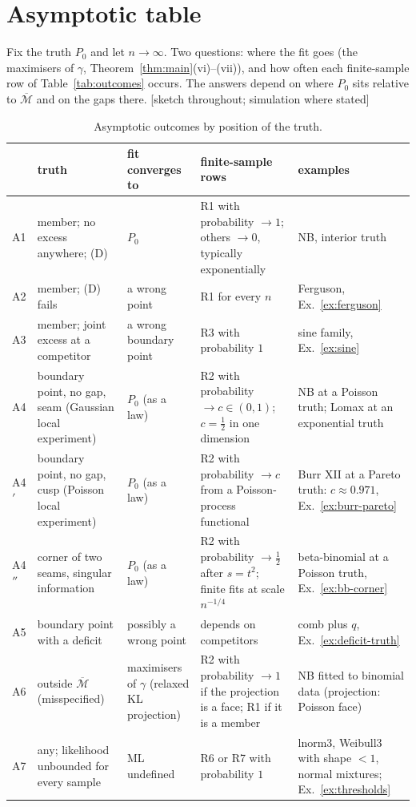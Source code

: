 \documentclass[11pt]{article}
\newcommand{\bM}{\overline{\mathcal M}}
\newcommand{\status}[1]{\textsf{[#1]}}
\theoremstyle{definition}
\theoremstyle{remark}
\begin{document}
\section{Asymptotic table}\label{sec:asymptotic}
Fix the truth $P_0$ and let $n\to\infty$. Two questions: where the fit goes
(the maximisers of $\gamma$, Theorem~\ref{thm:main}(vi)--(vii)), and how often
each finite-sample row of Table~\ref{tab:outcomes} occurs. The answers depend
on where $P_0$ sits relative to $\bM$ and on the gaps there.
\status{sketch throughout; simulation where stated}

\begin{table}[ht]
\centering\footnotesize
\begin{tabular}{@{}p{0.45cm}>{\raggedright\arraybackslash}p{3.1cm}>{\raggedright\arraybackslash}p{2.6cm}>{\raggedright\arraybackslash}p{3.4cm}>{\raggedright\arraybackslash}p{4.6cm}@{}}
\toprule
 & truth & fit converges to & finite-sample rows & examples\\
\midrule
A1 & member; no excess anywhere; (D) & $P_0$ & R1 with probability $\to1$; others $\to0$, typically exponentially & NB, interior truth\\
A2 & member; (D) fails & a wrong point & R1 for every $n$ & Ferguson, Ex.~\ref{ex:ferguson}\\
A3 & member; joint excess at a competitor & a wrong boundary point & R3 with probability $1$ & sine family, Ex.~\ref{ex:sine}\\
\midrule
A4 & boundary point, no gap, seam (Gaussian local experiment) & $P_0$ (as a law) & R2 with probability $\to c\in(0,1)$; $c=\frac12$ in one dimension & NB at a Poisson truth; Lomax at an exponential truth\\
A4$'$ & boundary point, no gap, cusp (Poisson local experiment) & $P_0$ (as a law) & R2 with probability $\to c$ from a Poisson-process functional & Burr XII at a Pareto truth: $c\approx0.971$, Ex.~\ref{ex:burr-pareto}\\
A4$''$ & corner of two seams, singular information & $P_0$ (as a law) & R2 with probability $\to\frac12$ after $s=t^2$; finite fits at scale $n^{-1/4}$ & beta-binomial at a Poisson truth, Ex.~\ref{ex:bb-corner}\\
A5 & boundary point with a deficit & possibly a wrong point & depends on competitors & comb plus $q$, Ex.~\ref{ex:deficit-truth}\\
\midrule
A6 & outside $\bM$ (misspecified) & maximisers of $\gamma$ (relaxed KL projection) & R2 with probability $\to1$ if the projection is a face; R1 if it is a member & NB fitted to binomial data (projection: Poisson face)\\
A7 & any; likelihood unbounded for every sample & ML undefined & R6 or R7 with probability $1$ & lnorm3, Weibull3 with shape $<1$, normal mixtures; Ex.~\ref{ex:thresholds}\\
\bottomrule
\end{tabular}
\caption{Asymptotic outcomes by position of the truth.}
\label{tab:asymptotic}
\end{table}
\end{document}
